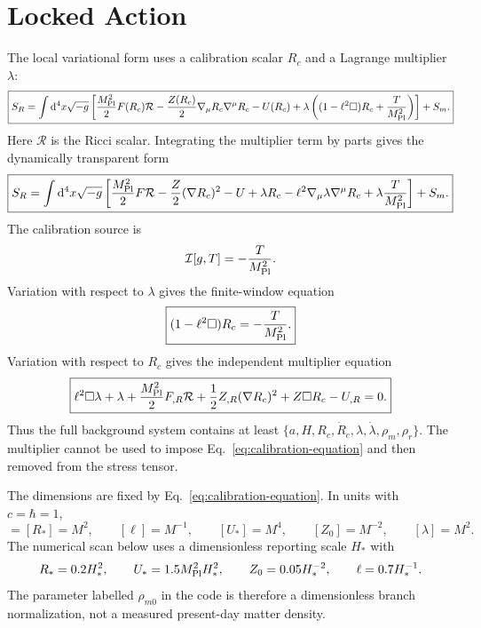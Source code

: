 \documentclass[12pt,a4paper]{article}
\newcommand{\dd}{\mathrm{d}}
\begin{document}
\section{Locked Action}

The local variational form uses a calibration scalar $R_c$ and a Lagrange multiplier $\lambda$:
\begin{equation}
\boxed{
S_R=\int\dd^4x\sqrt{-g}\left[
\frac{M_{\rm Pl}^2}{2}F(R_c)\mathcal R
-\frac{Z(R_c)}{2}\nabla_\mu R_c\nabla^\mu R_c
-U(R_c)
+\lambda\left((1-\ell^2\Box)R_c+\frac{T}{M_{\rm Pl}^2}\right)
\right]+S_m.
}
\label{eq:locked-action}
\end{equation}
Here $\mathcal R$ is the Ricci scalar. Integrating the multiplier term by parts gives the dynamically transparent form
\begin{equation}
\boxed{
S_R=\int\dd^4x\sqrt{-g}\left[
\frac{M_{\rm Pl}^2}{2}F\mathcal R
-\frac{Z}{2}(\nabla R_c)^2-U
+\lambda R_c
-\ell^2\nabla_\mu\lambda\nabla^\mu R_c
+\lambda\frac{T}{M_{\rm Pl}^2}
\right]+S_m .
}
\label{eq:ibp-action}
\end{equation}
The calibration source is
\begin{equation}
\mathcal I[g,T]=-\frac{T}{M_{\rm Pl}^2}.
\label{eq:cal-source}
\end{equation}
Variation with respect to $\lambda$ gives the finite-window equation
\begin{equation}
\boxed{(1-\ell^2\Box)R_c=-\frac{T}{M_{\rm Pl}^2}.}
\label{eq:calibration-equation}
\end{equation}
Variation with respect to $R_c$ gives the independent multiplier equation
\begin{equation}
\boxed{
\ell^2\Box\lambda+\lambda
+\frac{M_{\rm Pl}^2}{2}F_{,R}\mathcal R
+\frac12 Z_{,R}(\nabla R_c)^2
+Z\Box R_c
-U_{,R}=0.
}
\label{eq:Rvariation}
\end{equation}
Thus the full background system contains at least $\{a,H,R_c,\dot R_c,\lambda,\dot\lambda,\rho_m,\rho_r\}$. The multiplier cannot be used to impose Eq.~\eqref{eq:calibration-equation} and then removed from the stress tensor.

The dimensions are fixed by Eq.~\eqref{eq:calibration-equation}. In units with $c=\hbar=1$,
\begin{equation}
[R_c]=[R_*]=M^2,\qquad [\ell]=M^{-1},\qquad [U_*]=M^4,\qquad [Z_0]=M^{-2},\qquad [\lambda]=M^2.
\label{eq:dimensions}
\end{equation}
The numerical scan below uses a dimensionless reporting scale $H_*$ with
\begin{equation}
R_*=0.2H_*^2,\qquad U_*=1.5M_{\rm Pl}^2H_*^2,\qquad Z_0=0.05H_*^{-2},\qquad \ell=0.7H_*^{-1}.
\label{eq:units}
\end{equation}
The parameter labelled $\rho_{m0}$ in the code is therefore a dimensionless branch normalization, not a measured present-day matter density.
\end{document}
